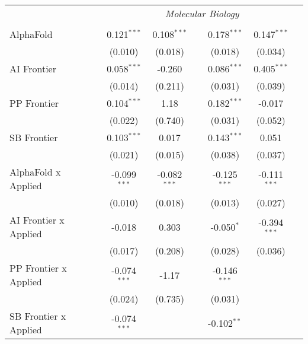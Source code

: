 \begin{tabular}{lcccccc}
 & \multicolumn{6}{c}{\textit{Molecular Biology}} \\ \\
   AlphaFold                      & 0.121$^{***}$  & 0.108$^{***}$  &                & 0.178$^{***}$  & 0.147$^{***}$  &   \\   
                                  & (0.010)        & (0.018)        &                & (0.018)        & (0.034)        &   \\   
   AI Frontier                    & 0.058$^{***}$  & -0.260         &                & 0.086$^{***}$  & 0.405$^{***}$  &   \\   
                                  & (0.014)        & (0.211)        &                & (0.031)        & (0.039)        &   \\   
   PP Frontier                    & 0.104$^{***}$  & 1.18           &                & 0.182$^{***}$  & -0.017         &   \\   
                                  & (0.022)        & (0.740)        &                & (0.031)        & (0.052)        &   \\   
   SB Frontier                    & 0.103$^{***}$  & 0.017          &                & 0.143$^{***}$  & 0.051          &   \\   
                                  & (0.021)        & (0.015)        &                & (0.038)        & (0.037)        &   \\   
   AlphaFold x Applied            & -0.099$^{***}$ & -0.082$^{***}$ &                & -0.125$^{***}$ & -0.111$^{***}$ &   \\   
                                  & (0.010)        & (0.018)        &                & (0.013)        & (0.027)        &   \\   
   AI Frontier x Applied          & -0.018         & 0.303          &                & -0.050$^{*}$   & -0.394$^{***}$ &   \\   
                                  & (0.017)        & (0.208)        &                & (0.028)        & (0.036)        &   \\   
   PP Frontier x Applied          & -0.074$^{***}$ & -1.17          &                & -0.146$^{***}$ &                &   \\   
                                  & (0.024)        & (0.735)        &                & (0.031)        &                &   \\   
   SB Frontier x Applied          & -0.074$^{***}$ &                &                & -0.102$^{**}$  &                &   \\   

\end{tabular}
